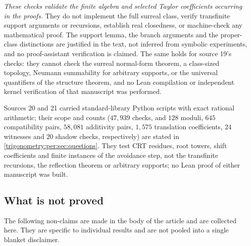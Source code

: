 \documentclass[11pt,letterpaper]{article}
\numberwithin{equation}{section}
\theoremstyle{definition}
\theoremstyle{remark}
\begin{document}
\emph{These checks validate the finite algebra and selected Taylor coefficients occurring in the
proofs.} They do not implement the full surreal class, verify transfinite support arguments or
recursions, establish real closedness, or machine-check any mathematical proof. The support lemma,
the branch arguments and the proper-class distinctions are justified in the text, not inferred from
symbolic experiments, and no proof-assistant verification is claimed. The same holds for source
19's checks: they cannot check the surreal normal-form theorem, a class-sized topology, Neumann
summability for arbitrary supports, or the universal quantifiers of the structure theorem, and no Lean
compilation or independent kernel verification of that manuscript was performed.

Sources 20 and 21 carried standard-library Python scripts with exact rational arithmetic; their scope
and counts ($47{,}939$ checks, and $128$ moduli, $645$ compatibility pairs, $58{,}081$ additivity pairs,
$1{,}575$ translation coefficients, $24$ witnesses and $20$ shadow checks, respectively) are stated in
\cref{trigonometry:per:sec:questions}. They test CRT residues, root towers, shift coefficients and
finite instances of the avoidance step, not the transfinite recursions, the reflection theorem or
arbitrary supports; no Lean proof of either manuscript was built.

\subsection{What is not proved}\label{trigonometry:sec:notproved}
The following non-claims are made in the body of the article and are collected here. They are
specific to individual results and are not pooled into a single blanket disclaimer.
\end{document}
